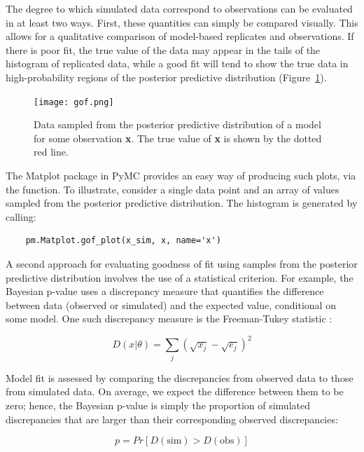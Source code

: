 The degree to which simulated data correspond to observations can be evaluated in at least two ways. First, these quantities can simply be compared visually. This allows for a qualitative comparison of model-based replicates and observations. If there is poor fit, the true value of the data may appear in the tails of the histogram of replicated data, while a good fit will tend to show the true data in high-probability regions of the posterior predictive distribution (Figure~\ref{fig:gof}).

\begin{figure}[h]
        \begin{center}
        \texttt{[image: gof.png]}
    \end{center}
    \caption{Data sampled from the posterior predictive distribution of a model for some observation \textbf{x}. The true value of \textbf{x} is shown by the dotted red line.}
    \label{fig:gof}
\end{figure}

The Matplot package in PyMC provides an easy way of producing such plots, via the  function. To illustrate, consider a single data point  and an array of values  sampled from the posterior predictive distribution. The histogram is generated by calling:

\begin{verbatim}
	pm.Matplot.gof_plot(x_sim, x, name='x')
\end{verbatim}

A second approach for evaluating goodness of fit using samples from the posterior predictive distribution involves the use of a statistical criterion. For example, the Bayesian p-value \citep{Gelman:1996gp} uses a discrepancy measure that quantifies the difference between data (observed or simulated) and the expected value, conditional on some model. One such discrepancy measure is the Freeman-Tukey statistic \citep{Brooks:2000il}:

\begin{equation}
	D(x|\theta) = \sum_j (\sqrt{x_j}-\sqrt{e_j})^2
\end{equation}

Model fit is assessed by comparing the discrepancies from observed data to those from simulated data. On average, we expect the difference between them to be zero; hence, the Bayesian p-value is simply the proportion of simulated discrepancies that are larger than their corresponding observed discrepancies:

\begin{equation}
	p = Pr[ D(\text{sim}) > D(\text{obs}) ]
\end{equation}

